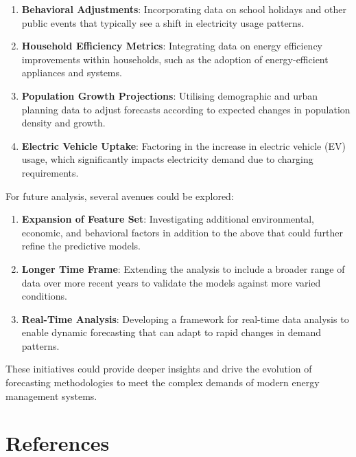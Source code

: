 \documentclass[mstat,12pt]{unswthesis}
\providecommand{\tightlist}{%
  \setlength{\itemsep}{0pt}\setlength{\parskip}{0pt}}
\begin{document}
\begin{enumerate}
\def\labelenumi{\arabic{enumi}.}
\tightlist
\item
  \textbf{Behavioral Adjustments}: Incorporating data on school holidays
  and other public events that typically see a shift in electricity
  usage patterns.
\item
  \textbf{Household Efficiency Metrics}: Integrating data on energy
  efficiency improvements within households, such as the adoption of
  energy-efficient appliances and systems.
\item
  \textbf{Population Growth Projections}: Utilising demographic and
  urban planning data to adjust forecasts according to expected changes
  in population density and growth.
\item
  \textbf{Electric Vehicle Uptake}: Factoring in the increase in
  electric vehicle (EV) usage, which significantly impacts electricity
  demand due to charging requirements.
\end{enumerate}

For future analysis, several avenues could be explored:

\begin{enumerate}
\def\labelenumi{\arabic{enumi}.}
\tightlist
\item
  \textbf{Expansion of Feature Set}: Investigating additional
  environmental, economic, and behavioral factors in addition to the
  above that could further refine the predictive models.
\item
  \textbf{Longer Time Frame}: Extending the analysis to include a
  broader range of data over more recent years to validate the models
  against more varied conditions.
\item
  \textbf{Real-Time Analysis}: Developing a framework for real-time data
  analysis to enable dynamic forecasting that can adapt to rapid changes
  in demand patterns.
\end{enumerate}

These initiatives could provide deeper insights and drive the evolution
of forecasting methodologies to meet the complex demands of modern
energy management systems.

\section*{References}\label{references}
\end{document}
